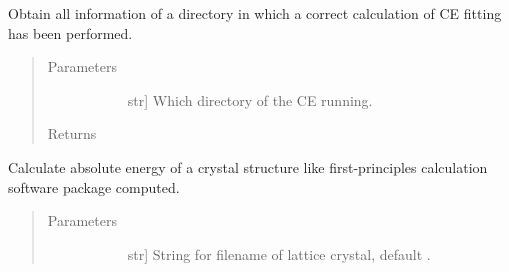 \documentclass[letterpaper,10pt,english]{sphinxmanual}
\begin{document}
\begin{fulllineitems}
\begin{fulllineitems}
\begin{quote}
\begin{description}
\begin{description}
\end{description}

\end{description}\end{quote}

\end{fulllineitems}


\begin{fulllineitems}
\label{\detokenize{pygace:pygace.ce.CE.fit}}
Obtain all information of a directory in which a correct calculation of
CE fitting has been performed.
\begin{quote}\begin{description}
\item[{Parameters}] \leavevmode\begin{description}
\item[{}] \leavevmode{[}str{]}
Which directory of the CE running.

\end{description}

\item[{Returns}] \leavevmode\begin{description}
\item[{}] \leavevmode
\end{description}

\end{description}\end{quote}

\end{fulllineitems}


\begin{fulllineitems}
\label{\detokenize{pygace:pygace.ce.CE.get_total_energy}}
Calculate absolute energy of a crystal structure like first-principles
calculation software package computed.
\begin{quote}\begin{description}
\item[{Parameters}] \leavevmode\begin{description}
\item[{}] \leavevmode{[}str{]}
String for filename of lattice crystal, default .


\end{description}
\end{description}
\end{quote}
\end{fulllineitems}
\end{fulllineitems}
\end{document}
